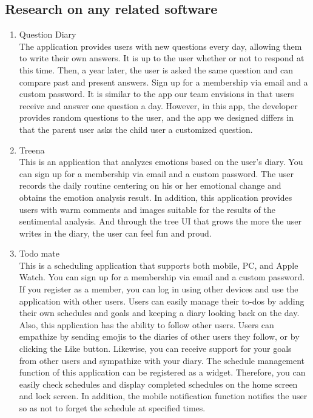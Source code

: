 \documentclass[conference]{IEEEtran}
\begin{document}
\subsection{\large{Research on any related software}}

\begin{enumerate}
    \item Question Diary
    \\
    The application provides users with new questions every day, allowing them to write their own answers. It is up to the user whether or not to respond at this time. Then, a year later, the user is asked the same question and can compare past and present answers. Sign up for a membership via email and a custom password. It is similar to the app our team envisions in that users receive and answer one question a day. However, in this app, the developer provides random questions to the user, and the app we designed differs in that the parent user asks the child user a customized question.
    \\
    
    \item Treena
    \\
    This is an application that analyzes emotions based on the user's diary. You can sign up for a membership via email and a custom password. The user records the daily routine centering on his or her emotional change and obtains the emotion analysis result. In addition, this application provides users with warm comments and images suitable for the results of the sentimental analysis. And through the tree UI that grows the more the user writes in the diary, the user can feel fun and proud.
    \\
    
    \item Todo mate
    \\
    This is a scheduling application that supports both mobile, PC, and Apple Watch. You can sign up for a membership via email and a custom password. If you register as a member, you can log in using other devices and use the application with other users. Users can easily manage their to-dos by adding their own schedules and goals and keeping a diary looking back on the day. Also, this application has the ability to follow other users. Users can empathize by sending emojis to the diaries of other users they follow, or by clicking the Like button. Likewise, you can receive support for your goals from other users and sympathize with your diary. The schedule management function of this application can be registered as a widget. Therefore, you can easily check schedules and display completed schedules on the home screen and lock screen. In addition, the mobile notification function notifies the user so as not to forget the schedule at specified times.
    \\


\end{enumerate}
\end{document}
